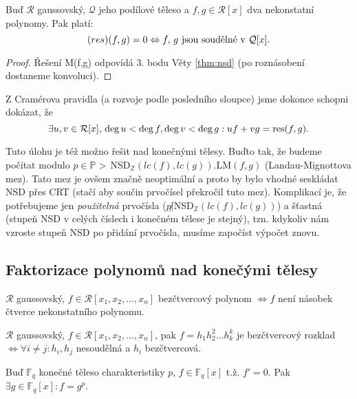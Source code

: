 \begin{thm}
    Buď $\mathcal{R}$ gaussovský, $\mathcal{Q}$ jeho podílové těleso a $f,g \in \mathcal{R}[x]$ dva nekonstatní polynomy. Pak platí:
    \[
        \text(res)(f,g)=0 \Leftrightarrow f,\,g\text{ jsou soudělné v } \mathcal{Q}[x].
    \]
    \begin{proof}
        Řešení M(f,g) odpovídá 3. bodu Věty \ref{thm:nsd} (po roznásobení dostaneme konvoluci).
    \end{proof}
\end{thm}

Z Cramérova pravidla (a rozvoje podle posledního sloupce) jsme dokonce schopni dokázat, že
\[
    \exists u,v \in \mathcal{R}[x],\, \text{deg\,}u<\text{deg\,}f,\text{deg\,}v<\text{deg\,}g:uf+vg=\text{res}(f,g).
\]

Tuto úlohu je též možno řešit nad konečnými tělesy. Buďto tak, že budeme počítat modulo $p \in \mathbb{P} >\,$NSD$_\mathbb{Z}(lc(f),lc(g)).$LM$(f,g)$ (Landau-Mignottova mez). Tato mez je ovšem značně neoptimální a proto by bylo vhodné seskládat NSD přes CRT (stačí aby součin prvočísel překročil tuto mez). Komplikací je, že potřebujeme jen \textit{použitelná} prvočísla ($p\not|$NSD$_\mathbb{Z}(lc(f),lc(g))$) a šťastná (stupeň NSD v celých číslech i konečném tělese je stejný), tzn. kdykoliv nám vzroste stupeň NSD po přidání prvočísla, musíme započíst výpočet znovu.

\subsection*{Faktorizace polynomů nad konečými tělesy}
\begin{defn}
    $\mathcal{R}$ gaussovský, $f\in\mathcal{R}[x_1,x_2,\dots,x_n]$ bezčtvercový polynom $\Leftrightarrow f$ není násobek čtverce nekonstatního polynomu.
\end{defn}

\begin{defn}
    $\mathcal{R}$ gaussovský, $f\in\mathcal{R}[x_1,x_2,\dots,x_n]$, pak $f=h_1h_2^2\dots h_k^k$ je bezčtvercový rozklad $\Leftrightarrow \forall i\neq j:h_i,h_j$ nesoudělná a $h_i$ bezčtvercová.
\end{defn}

\begin{lemma}
    Buď $\mathbb{F}_q$ konečné těleso charakteristiky $p$, $f \in \mathbb{F}_q[x]$ t.ž. $f'=0$. Pak $\exists g\in\mathbb{F}_q[x]:f=g^p$.
\end{lemma}


